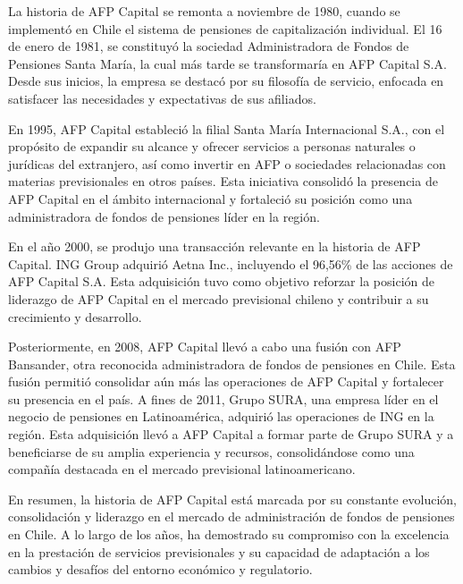 La historia de AFP Capital se remonta a noviembre de 1980, cuando se implementó en Chile el sistema de pensiones de capitalización individual. El 16 de enero de 1981, se constituyó la sociedad Administradora de Fondos de Pensiones Santa María, la cual más tarde se transformaría en AFP Capital S.A. Desde sus inicios, la empresa se destacó por su filosofía de servicio, enfocada en satisfacer las necesidades y expectativas de sus afiliados.

En 1995, AFP Capital estableció la filial Santa María Internacional S.A., con el propósito de expandir su alcance y ofrecer servicios a personas naturales o jurídicas del extranjero, así como invertir en AFP o sociedades relacionadas con materias previsionales en otros países. Esta iniciativa consolidó la presencia de AFP Capital en el ámbito internacional y fortaleció su posición como una administradora de fondos de pensiones líder en la región.

En el año 2000, se produjo una transacción relevante en la historia de AFP Capital. ING Group adquirió Aetna Inc., incluyendo el 96,56\% de las acciones de AFP Capital S.A. Esta adquisición tuvo como objetivo reforzar la posición de liderazgo de AFP Capital en el mercado previsional chileno y contribuir a su crecimiento y desarrollo.

Posteriormente, en 2008, AFP Capital llevó a cabo una fusión con AFP Bansander, otra reconocida administradora de fondos de pensiones en Chile. Esta fusión permitió consolidar aún más las operaciones de AFP Capital y fortalecer su presencia en el país. A fines de 2011, Grupo SURA, una empresa líder en el negocio de pensiones en Latinoamérica, adquirió las operaciones de ING en la región. Esta adquisición llevó a AFP Capital a formar parte de Grupo SURA y a beneficiarse de su amplia experiencia y recursos, consolidándose como una compañía destacada en el mercado previsional latinoamericano.

En resumen, la historia de AFP Capital está marcada por su constante evolución, consolidación y liderazgo en el mercado de administración de fondos de pensiones en Chile. A lo largo de los años, ha demostrado su compromiso con la excelencia en la prestación de servicios previsionales y su capacidad de adaptación a los cambios y desafíos del entorno económico y regulatorio.

\vspace{1.0cm}

